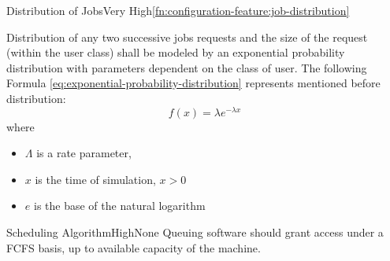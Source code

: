 	\begin{functional}{Distribution of Jobs}{Very High}{\ref{fn:configuration-feature:job-distribution}}
		\label{fn:simulation-feature:distribution-of-jobs}
		{
			Distribution of any two successive jobs requests and the size of the request (within the user class) shall be modeled by an exponential probability distribution with parameters dependent on the class of user. The following Formula \eqref{eq:exponential-probability-distribution} represents mentioned before distribution:
			\begin{equation} \label{eq:exponential-probability-distribution}
				f(x) = \lambda e^{-\lambda x}
			\end{equation}
			where 
			\begin{itemize}
				\item $\Lambda$ is a rate parameter,
				\item $x$ is the time of simulation, $x > 0$
				\item $e$ is the base of the natural logarithm
			\end{itemize}
		}
	\end{functional}

	\begin{functional}{Scheduling Algorithm}{High}{None}
		\label{fn:simulation-feature:scheduling-algorithm}
		{
			Queuing software should grant access under a \gls{FCFS} basis, up to available capacity of the machine.
		}
	\end{functional}
